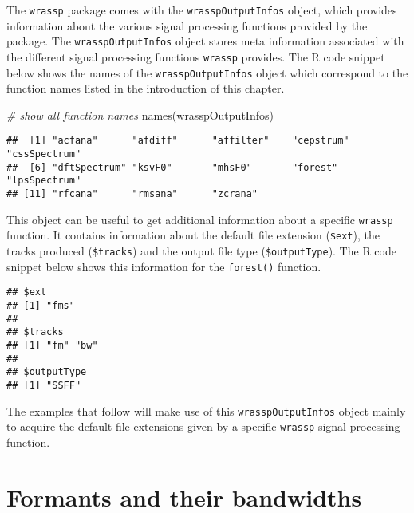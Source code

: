 \documentclass[
]{book}
\newenvironment{Shaded}{\begin{snugshade}}{\end{snugshade}}
\newcommand{\CommentTok}[1]{\textcolor[rgb]{0.56,0.35,0.01}{\textit{#1}}}
\newcommand{\FunctionTok}[1]{\textcolor[rgb]{0.00,0.00,0.00}{#1}}
\newcommand{\NormalTok}[1]{#1}
\newcommand{\SpecialCharTok}[1]{\textcolor[rgb]{0.00,0.00,0.00}{#1}}
\begin{document}
The \texttt{wrassp} package comes with the \texttt{wrasspOutputInfos} object, which provides information about the various signal processing functions provided by the package. The \texttt{wrasspOutputInfos} object stores meta information associated with the different signal processing functions \texttt{wrassp} provides. The R code snippet below shows the names of the \texttt{wrasspOutputInfos} object which correspond to the function names listed in the introduction of this chapter.

\begin{Shaded}
\begin{Highlighting}[]
\CommentTok{\# show all function names}
\FunctionTok{names}\NormalTok{(wrasspOutputInfos)}
\end{Highlighting}
\end{Shaded}

\begin{verbatim}
##  [1] "acfana"      "afdiff"      "affilter"    "cepstrum"    "cssSpectrum"
##  [6] "dftSpectrum" "ksvF0"       "mhsF0"       "forest"      "lpsSpectrum"
## [11] "rfcana"      "rmsana"      "zcrana"
\end{verbatim}

This object can be useful to get additional information about a specific \texttt{wrassp} function. It contains information about the default file extension (\texttt{\$ext}), the tracks produced (\texttt{\$tracks}) and the output file type (\texttt{\$outputType}). The R code snippet below shows this information for the \texttt{forest()} function.

\begin{Shaded}
\end{Shaded}

\begin{verbatim}
## $ext
## [1] "fms"
## 
## $tracks
## [1] "fm" "bw"
## 
## $outputType
## [1] "SSFF"
\end{verbatim}

The examples that follow will make use of this \texttt{wrasspOutputInfos} object mainly to acquire the default file extensions given by a specific \texttt{wrassp} signal processing function.

\hypertarget{subsec:wrassp-formants}{%
\section{Formants and their bandwidths}\label{subsec:wrassp-formants}}
\end{document}
